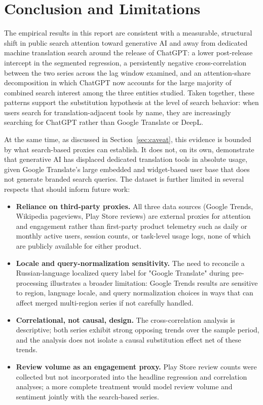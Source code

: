 \documentclass[11pt]{article}
\begin{document}
\section{Conclusion and Limitations}

The empirical results in this report are consistent with a measurable, structural shift in public search attention toward generative AI and away from dedicated machine translation search around the release of ChatGPT: a lower post-release intercept in the segmented regression, a persistently negative cross-correlation between the two series across the lag window examined, and an attention-share decomposition in which ChatGPT now accounts for the large majority of combined search interest among the three entities studied. Taken together, these patterns support the substitution hypothesis at the level of search behavior: when users search for translation-adjacent tools by name, they are increasingly searching for ChatGPT rather than Google Translate or DeepL.

At the same time, as discussed in Section~\ref{sec:caveat}, this evidence is bounded by what search-based proxies can establish. It does not, on its own, demonstrate that generative AI has displaced dedicated translation tools in absolute usage, given Google Translate's large embedded and widget-based user base that does not generate branded search queries. The dataset is further limited in several respects that should inform future work:

\begin{itemize}
    \item \textbf{Reliance on third-party proxies.} All three data sources (Google Trends, Wikipedia pageviews, Play Store reviews) are external proxies for attention and engagement rather than first-party product telemetry such as daily or monthly active users, session counts, or task-level usage logs, none of which are publicly available for either product.
    \item \textbf{Locale and query-normalization sensitivity.} The need to reconcile a Russian-language localized query label for "Google Translate" during pre-processing illustrates a broader limitation: Google Trends results are sensitive to region, language locale, and query normalization choices in ways that can affect merged multi-region series if not carefully handled.
    \item \textbf{Correlational, not causal, design.} The cross-correlation analysis is descriptive; both series exhibit strong opposing trends over the sample period, and the analysis does not isolate a causal substitution effect net of these trends.
    \item \textbf{Review volume as an engagement proxy.} Play Store review counts were collected but not incorporated into the headline regression and correlation analyses; a more complete treatment would model review volume and sentiment jointly with the search-based series.
\end{itemize}
\end{document}
